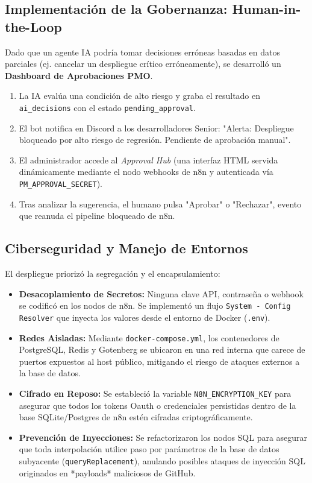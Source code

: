 \documentclass{encabezado}
\begin{document}
\subsection{Implementación de la Gobernanza: Human-in-the-Loop}

Dado que un agente IA podría tomar decisiones erróneas basadas en datos parciales (ej. cancelar un despliegue crítico erróneamente), se desarrolló un \textbf{Dashboard de Aprobaciones PMO}.
\begin{enumerate}
    \item La IA evalúa una condición de alto riesgo y graba el resultado en \texttt{ai\_decisions} con el estado \texttt{pending\_approval}.
    \item El bot notifica en Discord a los desarrolladores Senior: "Alerta: Despliegue bloqueado por alto riesgo de regresión. Pendiente de aprobación manual".
    \item El administrador accede al \textit{Approval Hub} (una interfaz HTML servida dinámicamente mediante el nodo webhooks de n8n y autenticada vía \texttt{PM\_APPROVAL\_SECRET}).
    \item Tras analizar la sugerencia, el humano pulsa "Aprobar" o "Rechazar", evento que reanuda el pipeline bloqueado de n8n.
\end{enumerate}

\subsection{Ciberseguridad y Manejo de Entornos}

El despliegue priorizó la segregación y el encapsulamiento:
\begin{itemize}
    \item \textbf{Desacoplamiento de Secretos:} Ninguna clave API, contraseña o webhook se codificó en los nodos de n8n. Se implementó un flujo \texttt{System - Config Resolver} que inyecta los valores desde el entorno de Docker (\texttt{.env}).
    \item \textbf{Redes Aisladas:} Mediante \texttt{docker-compose.yml}, los contenedores de PostgreSQL, Redis y Gotenberg se ubicaron en una red interna que carece de puertos expuestos al host público, mitigando el riesgo de ataques externos a la base de datos.
    \item \textbf{Cifrado en Reposo:} Se estableció la variable \texttt{N8N\_ENCRYPTION\_KEY} para asegurar que todos los tokens Oauth o credenciales persistidas dentro de la base SQLite/Postgres de n8n estén cifradas criptográficamente.
    \item \textbf{Prevención de Inyecciones:} Se refactorizaron los nodos SQL para asegurar que toda interpolación utilice paso por parámetros de la base de datos subyacente (\texttt{queryReplacement}), anulando posibles ataques de inyección SQL originados en *payloads* maliciosos de GitHub.
\end{itemize}
\end{document}
